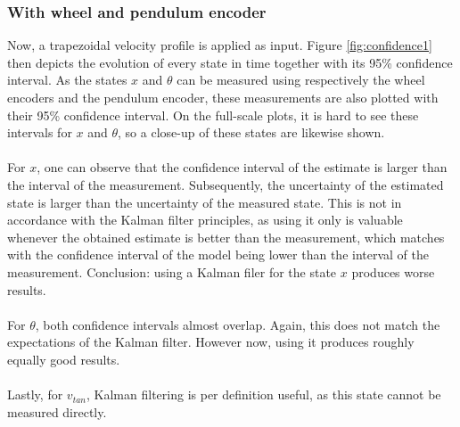 \documentclass[a4paper,kul]{kulakarticle} %
\begin{document}
\subsubsection*{With wheel and pendulum encoder}
Now, a trapezoidal velocity profile is applied as input. Figure \ref{fig:confidence1} then depicts the evolution of every state in time together with its 95\% confidence interval. As the states $x$ and $\theta$ can be measured using respectively the wheel encoders and the pendulum encoder, these measurements are also plotted with their 95\% confidence interval. On the full-scale plots, it is hard to see these intervals for $x$ and $\theta$, so a close-up of these states are likewise shown. 
\\\\
For $x$, one can observe that the confidence interval of the estimate is larger than the interval of the measurement. Subsequently, the uncertainty of the estimated state is larger than the uncertainty of the measured state. This is not in accordance with the Kalman filter principles, as using it only is valuable whenever the obtained estimate is better than the measurement, which matches with the confidence interval of the model being lower than the interval of the measurement. Conclusion: using a Kalman filer for the state $x$ produces worse results.
\\\\
For $\theta$, both confidence intervals almost overlap. Again, this does not match the expectations of the Kalman filter. However now, using it produces roughly equally good results. 
\\\\
Lastly, for $v_{tan}$, Kalman filtering is per definition useful, as this state cannot be measured directly.
\end{document}
